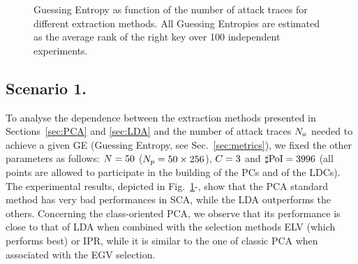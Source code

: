 \begin{figure}[t]
\caption[Guessing Entropy as function of the number of attack traces]{Guessing Entropy as function of the number of attack traces for different extraction methods. All Guessing Entropies are estimated as the average rank of the right key over 100 independent experiments.}\label{fig:scenario1}
\end{figure}
\subsection{Scenario 1.}
To analyse the dependence between the extraction methods presented in Sections~\ref{sec:PCA} and \ref{sec:LDA} and the number of attack traces $N_a$ needed to achieve a given GE (Guessing Entropy, see Sec.~\ref{sec:metrics}), we fixed the other parameters as follows: $N=50$ ($N_p=50\times 256$), $C = 3$ and $\sharp\mathrm{PoI} = 3996$ (all points are allowed to participate in the building of the PCs and of the LDCs). The experimental results, depicted in Fig.~\ref{fig:scenario1}-, show that the PCA standard method has very bad performances in SCA, while the LDA outperforms the others. Concerning the class-oriented PCA, we observe that its performance is close to that of LDA when combined with the selection methods ELV (which performs best) or IPR, while it is similar to the one of classic PCA when associated with the EGV selection.



